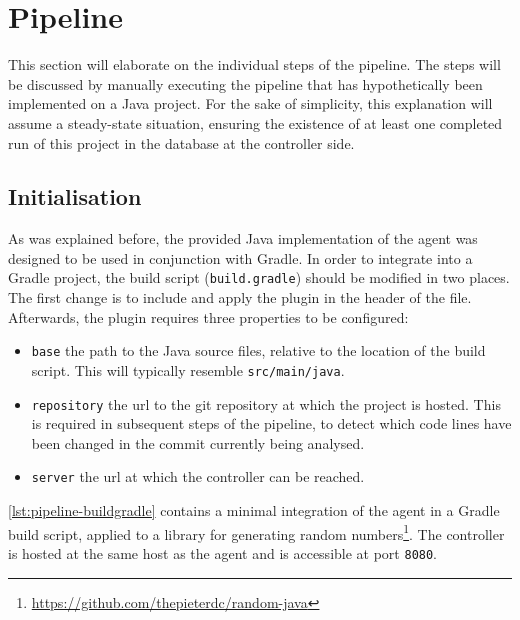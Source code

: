 
\section{Pipeline}
This section will elaborate on the individual steps of the pipeline. The steps will be discussed by manually executing the pipeline that has hypothetically been implemented on a Java project. For the sake of simplicity, this explanation will assume a steady-state situation, ensuring the existence of at least one completed run of this project in the database at the controller side.

\subsection{Initialisation}\label{ssec:pipeline-initialisation}
As was explained before, the provided Java implementation of the agent was designed to be used in conjunction with Gradle. In order to integrate \velocity{} into a Gradle project, the build script (\texttt{build.gradle}) should be modified in two places. The first change is to include and apply the plugin in the header of the file. Afterwards, the plugin requires three properties to be configured:
\begin{itemize}
	\item \texttt{base} the path to the Java source files, relative to the location of the build script. This will typically resemble \texttt{src/main/java}.
	
	\item \texttt{repository} the url to the git repository at which the project is hosted. This is required in subsequent steps of the pipeline, to detect which code lines have been changed in the commit currently being analysed.
	
	\item \texttt{server} the url at which the controller can be reached.
\end{itemize}

\noindent \autoref{lst:pipeline-buildgradle} contains a minimal integration of the agent in a Gradle build script, applied to a library for generating random numbers\footnote{\url{https://github.com/thepieterdc/random-java}}. The controller is hosted at the same host as the agent and is accessible at port \texttt{8080}.



